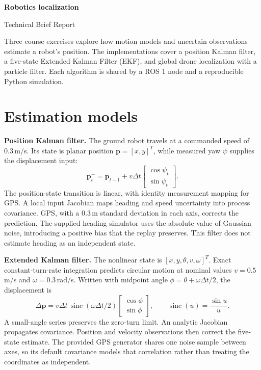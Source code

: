 \documentclass[10pt,a4paper]{article}
\begin{document}
{\LARGE\bfseries Robotics localization}\par
{\large\color{navy}Technical Brief Report}\par
\vspace{3pt}
Three course exercises explore how motion models and uncertain observations estimate a robot's position. The implementations cover a position Kalman filter, a five-state Extended Kalman Filter (EKF), and global drone localization with a particle filter. Each algorithm is shared by a ROS 1 node and a reproducible Python simulation.

\section*{Estimation models}
\textbf{Position Kalman filter.} The ground robot travels at a commanded speed of 0.3\,m/s. Its state is planar position $\mathbf p=[x,y]^T$, while measured yaw $\psi$ supplies the displacement input:
\[
\mathbf p^-_t=\mathbf p_{t-1}+v\Delta t
\begin{bmatrix}\cos\psi_t\\\sin\psi_t\end{bmatrix}.
\]
The position-state transition is linear, with identity measurement mapping for GPS. A local input Jacobian maps heading and speed uncertainty into process covariance. GPS, with a 0.3\,m standard deviation in each axis, corrects the prediction. The supplied heading simulator uses the absolute value of Gaussian noise, introducing a positive bias that the replay preserves. This filter does not estimate heading as an independent state.

\textbf{Extended Kalman filter.} The nonlinear state is $[x,y,\theta,v,\omega]^T$. Exact constant-turn-rate integration predicts circular motion at nominal values $v=0.5$\,m/s and $\omega=0.3$\,rad/s. Written with midpoint angle $\phi=\theta+\omega\Delta t/2$, the displacement is
\[
\Delta\mathbf p=v\Delta t\,\operatorname{sinc}(\omega\Delta t/2)
\begin{bmatrix}\cos\phi\\\sin\phi\end{bmatrix},\qquad
\operatorname{sinc}(u)=\frac{\sin u}{u}.
\]
A small-angle series preserves the zero-turn limit. An analytic Jacobian propagates covariance. Position and velocity observations then correct the five-state estimate. The provided GPS generator shares one noise sample between axes, so its default covariance models that correlation rather than treating the coordinates as independent.
\end{document}
